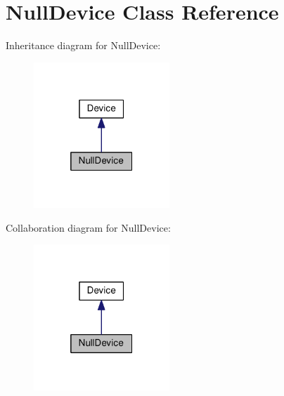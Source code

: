 \hypertarget{class_null_device}{}\section{Null\+Device Class Reference}
\label{class_null_device}


Inheritance diagram for Null\+Device\+:
\nopagebreak
\begin{figure}[H]
\begin{center}
\leavevmode
\includegraphics[width=145pt]{class_null_device__inherit__graph}
\end{center}
\end{figure}


Collaboration diagram for Null\+Device\+:
\nopagebreak
\begin{figure}[H]
\begin{center}
\leavevmode
\includegraphics[width=145pt]{class_null_device__coll__graph}
\end{center}
\end{figure}
